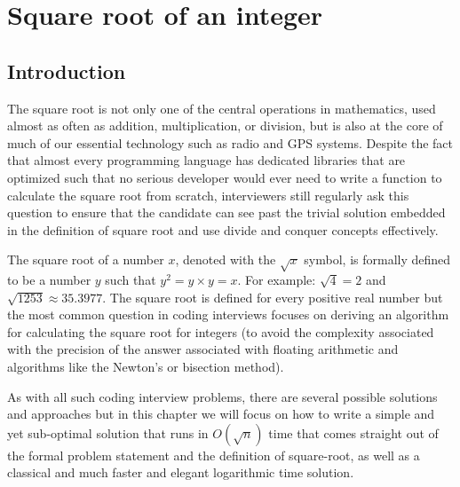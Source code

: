%


\chapter{Square root of an integer}
\label{ch:square_root}
\section*{Introduction}

The square root is not only one of the central operations in mathematics, used almost as often as addition, multiplication, or division, but is also at the core of much of our essential technology such as radio and GPS systems. 
Despite the fact that almost every programming language has dedicated libraries that are optimized such that no serious developer would ever need to write a function to calculate the square root from scratch,  interviewers still regularly ask  this question to ensure that the candidate can see past the trivial solution embedded in the definition of square root and use divide and conquer concepts effectively.


The square root of a number $x$, denoted with the $\sqrt{x}$ symbol, is formally defined to be a number $y$ such that $y^2 = y\times y=x$.
For example: $\sqrt{4} = 2$ and $\sqrt{1253} \approx 35.3977$.
The square root is defined for every positive real number but the most common question in coding interviews focuses on deriving an algorithm for calculating the square root for integers (to avoid the complexity associated with the precision of the answer associated with floating arithmetic and algorithms like the Newton's  or bisection method).

As with all such coding interview problems,  there are several possible solutions and approaches but in this chapter we will focus on how to write a simple and yet sub-optimal solution that runs in $O(\sqrt{n})$ time that comes straight out of the formal problem statement and the definition of square-root,
as well as a classical and much faster and elegant logarithmic time solution.


